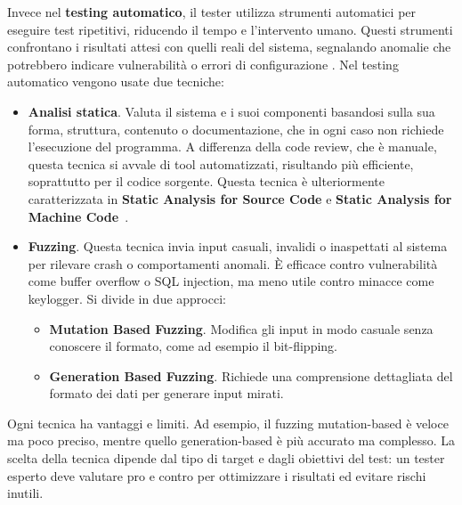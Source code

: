             Invece nel \textbf{testing automatico}, il tester utilizza strumenti automatici per eseguire test ripetitivi, riducendo il tempo e l'intervento umano. Questi strumenti confrontano i risultati attesi con quelli reali del sistema, segnalando anomalie che potrebbero indicare vulnerabilità o errori di configurazione \cite{vulnerability_assessment_techniques}. Nel testing automatico vengono usate due tecniche:
            \begin{itemize}
                \item \textbf{Analisi statica}. Valuta il sistema e i suoi componenti basandosi sulla sua forma, struttura, contenuto o documentazione, che in ogni caso non richiede l'esecuzione del programma. A differenza della code review, che è manuale, questa tecnica si avvale di tool automatizzati, risultando più efficiente, soprattutto per il codice sorgente. Questa tecnica è ulteriormente caratterizzata in \textbf{Static Analysis for Source Code} e \textbf{Static Analysis for Machine Code}~\cite{static_analysis}.
                \item \textbf{Fuzzing}. Questa tecnica invia input casuali, invalidi o inaspettati al sistema per rilevare crash o comportamenti anomali. È efficace contro vulnerabilità come buffer overflow o SQL injection, ma meno utile contro minacce come keylogger. Si divide in due approcci:
                    \begin{itemize}
                        \item \textbf{Mutation Based Fuzzing}. Modifica gli input in modo casuale senza conoscere il formato, come ad esempio il bit-flipping.
                        \item \textbf{Generation Based Fuzzing}. Richiede una comprensione dettagliata del formato dei dati per generare input mirati.
                    \end{itemize}
            \end{itemize}

            Ogni tecnica ha vantaggi e limiti. Ad esempio, il fuzzing mutation-based è veloce ma poco preciso, mentre quello generation-based è più accurato ma complesso. La scelta della tecnica dipende dal tipo di target e dagli obiettivi del test: un tester esperto deve valutare pro e contro per ottimizzare i risultati ed evitare rischi inutili.

